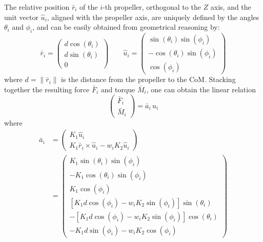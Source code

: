 The relative position $\bar{r}_i$ of the $i$-th propeller, orthogonal to the
$Z$ axis, and the unit vector $\hat{u}_i$, aligned with the propeller
axis, are uniquely defined by the angles $\theta_i$ and $\phi_i$, and can be
easily obtained from geometrical reasoning by:
\begin{equation}
  \bar{r}_i = \left(
    \begin{array}{c}
      d\cos(\theta_i) \\
      d\sin(\theta_i) \\
      0
      \end{array}
    \right)
    \qquad
    \hat{u}_i = \left(
      \begin{array}{c}
        \sin(\theta_i)\sin(\phi_i) \\
        -\cos(\theta_i)\sin(\phi_i) \\
        \cos(\phi_i)
      \end{array}
      \right)
\end{equation}
where $d=\|\bar{r}_i\|$ is the distance from the propeller to the CoM.
Stacking together the resulting force $\bar{F}_i$ and torque
$\bar{M}_i$, one can obtain the linear relation
\begin{equation}
  \label{eq:fm}
  \left(
    \begin{array}{c}
      \bar{F}_i \\
      \bar{M}_i
    \end{array}
  \right) = \bar{a}_i\,u_i
\end{equation}
where
\begin{equation}
  \begin{split}
    \bar{a}_i  &= \left(
      \begin{array}{c}
        K_1 \hat{u}_i \\
        K_1 \bar{r}_i \times \hat{u}_i - w_i K_2 \hat{u}_i
      \end{array}
    \right) \\
    &= \left(
      \begin{array}{c}
        K_1 \sin(\theta_i)\sin(\phi_i) \\
        -K_1 \cos(\theta_i)\sin(\phi_i) \\
        K_1 \cos(\phi_i) \\
        \left[K_1 d \cos(\phi_i) - w_i K_2 \sin(\phi_i)\right]\sin(\theta_i) \\
        -\left[K_1 d \cos(\phi_i) - w_i K_2 \sin(\phi_i)\right]\cos(\theta_i) \\
        -K_1 d \sin(\phi_i) - w_i K_2 \cos(\phi_i)
      \end{array}
    \right)
    \end{split}
\end{equation}

